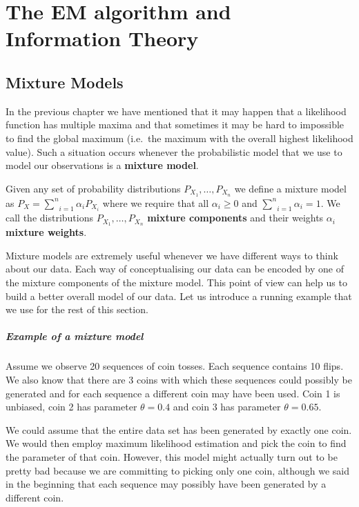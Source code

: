\chapter{The EM algorithm and Information Theory}

\section{Mixture Models}\label{sec:mixtureModels}

In the previous chapter we have mentioned that it may happen that a likelihood function has multiple 
maxima and that sometimes it may be hard to impossible to find the global maximum (i.e.\ the maximum
with the overall highest likelihood value). Such a situation occurs whenever the probabilistic model
that we use to model our observations is a \textbf{mixture model}.

\begin{Definition}\label{def:mixtureModel}
Given any set of probability distributions $ P_{X_1}, \ldots, P_{X_n} $ 
we define a mixture model as
$ P_X = \underset{i=1}{\overset{n}{\sum}} \alpha_{i}P_{X_i} $
where we require that all $ \alpha_{i} \geq 0$ and 
$ \underset{i=1}{\overset{n}{\sum}} \alpha_{i} = 1 $.
We call the distributions $ P_{X_1}, \ldots, P_{X_n} $ \textbf{mixture components} and their weights
$ \alpha_{i} $ \textbf{mixture weights}.
\end{Definition}

Mixture models are extremely useful whenever we have different ways to think about our data. Each way
of conceptualising our data can be encoded by one of the mixture components of the mixture model.
This point of view can help us to build a better overall model of our data. Let us introduce a running example that
we use for the rest of this section. 

\paragraph{Example of a mixture model} Assume we observe 20 sequences of coin tosses. Each sequence
contains 10 flips. We also know that there are 3 coins with which these sequences could possibly be
generated and for each sequence a different coin may have been used. Coin 1 is unbiased, coin 2 has
parameter $ \theta = 0.4 $ and coin 3 has parameter $ \theta = 0.65 $. 
 
We could assume that the entire data set has been generated by exactly one coin. We would then employ maximum likelihood estimation 
and pick the coin to find the parameter of that coin. However, this model might actually turn out to be
pretty bad because we are committing to picking only one coin, although we said in the beginning that
each sequence may possibly have been generated by a different coin. 

